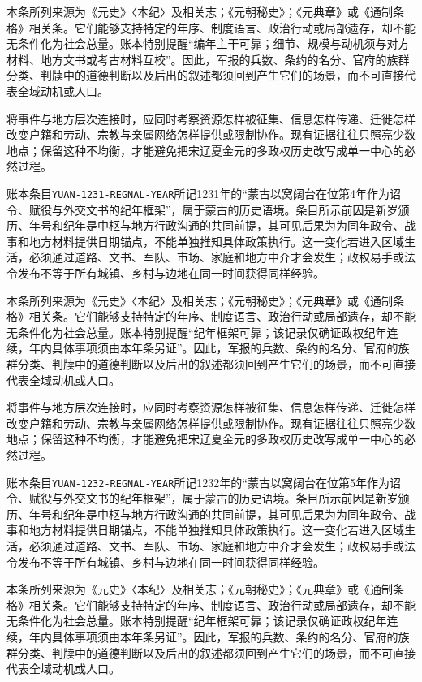 本条所列来源为《元史》〈本纪〉及相关志；《元朝秘史》；《元典章》或《通制条格》相关条。它们能够支持特定的年序、制度语言、政治行动或局部遗存，却不能无条件化为社会总量。账本特别提醒“编年主干可靠；细节、规模与动机须与对方材料、地方文书或考古材料互校”。因此，军报的兵数、条约的名分、官府的族群分类、判牍中的道德判断以及后出的叙述都须回到产生它们的场景，而不可直接代表全域动机或人口。

将事件与地方层次连接时，应同时考察资源怎样被征集、信息怎样传递、迁徙怎样改变户籍和劳动、宗教与亲属网络怎样提供或限制协作。现有证据往往只照亮少数地点；保留这种不均衡，才能避免把宋辽夏金元的多政权历史改写成单一中心的必然过程。

账本条目\texttt{YUAN-1231-REGNAL-YEAR}所记1231年的“蒙古以窝阔台在位第4年作为诏令、赋役与外交文书的纪年框架”，属于蒙古的历史语境。条目所示前因是新岁颁历、年号和纪年是中枢与地方行政沟通的共同前提，其可见后果为为同年政令、战事和地方材料提供日期锚点，不能单独推知具体政策执行。这一变化若进入区域生活，必须通过道路、文书、军队、市场、家庭和地方中介才会发生；政权易手或法令发布不等于所有城镇、乡村与边地在同一时间获得同样经验。

本条所列来源为《元史》〈本纪〉及相关志；《元朝秘史》；《元典章》或《通制条格》相关条。它们能够支持特定的年序、制度语言、政治行动或局部遗存，却不能无条件化为社会总量。账本特别提醒“纪年框架可靠；该记录仅确证政权纪年连续，年内具体事项须由本年条另证”。因此，军报的兵数、条约的名分、官府的族群分类、判牍中的道德判断以及后出的叙述都须回到产生它们的场景，而不可直接代表全域动机或人口。

将事件与地方层次连接时，应同时考察资源怎样被征集、信息怎样传递、迁徙怎样改变户籍和劳动、宗教与亲属网络怎样提供或限制协作。现有证据往往只照亮少数地点；保留这种不均衡，才能避免把宋辽夏金元的多政权历史改写成单一中心的必然过程。

账本条目\texttt{YUAN-1232-REGNAL-YEAR}所记1232年的“蒙古以窝阔台在位第5年作为诏令、赋役与外交文书的纪年框架”，属于蒙古的历史语境。条目所示前因是新岁颁历、年号和纪年是中枢与地方行政沟通的共同前提，其可见后果为为同年政令、战事和地方材料提供日期锚点，不能单独推知具体政策执行。这一变化若进入区域生活，必须通过道路、文书、军队、市场、家庭和地方中介才会发生；政权易手或法令发布不等于所有城镇、乡村与边地在同一时间获得同样经验。

本条所列来源为《元史》〈本纪〉及相关志；《元朝秘史》；《元典章》或《通制条格》相关条。它们能够支持特定的年序、制度语言、政治行动或局部遗存，却不能无条件化为社会总量。账本特别提醒“纪年框架可靠；该记录仅确证政权纪年连续，年内具体事项须由本年条另证”。因此，军报的兵数、条约的名分、官府的族群分类、判牍中的道德判断以及后出的叙述都须回到产生它们的场景，而不可直接代表全域动机或人口。

